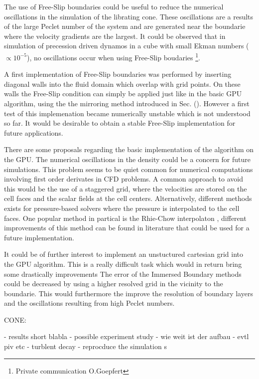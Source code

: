The use of Free-Slip boundaries could be useful to reduce the numerical oscillations in the simulation of the librating cone.
These oscillations are a results of the large Peclet number of the system and are generated
near the boundarie where the velocity gradients are the largest.
It could be observed that in simulation of precession driven dynamos in a cube with small Ekman numbers ($\propto 10^{-5}$),
no oscillations occur when using Free-Slip boudaries \footnote{Private communication O.Goepfert}.

A first implementation of Free-Slip boundaries was performed
by inserting diagonal walls into the fluid domain which overlap with grid points.
On these walls the Free-Slip condition can simply be applied just like in the basic GPU algorithm,
using the the mirroring method introduced in Sec. ().
However a first test of this implemenation became numerically unstable which is not understood so far.
It would be desirable to obtain a stable  Free-Slip implementation for future applications.

There are some proposals regarding the basic implementation of the algorithm on the GPU.
The numerical oscillations in the density could be a concern for future simulations.
This problem seems to be quiet common for numerical computations involving first order derivates in CFD problems.
A common approach to avoid this would be the use of a staggered grid, where the velocities
are stored on the cell faces and the scalar fields at the cell centers.
Alternatively, different methods exists for pressure-based solvers where the pressure is interpolated to the cell faces.
One popular method in partical is the Rhie-Chow interpolaton \citep{uiae},
different improvements of this method can be found in literature \citep{uiae} that could be used for a future implementation.

It could be of further interest to implement an unstuctured cartesian grid into the GPU algorithm.
This is a really difficult task which would in return bring some drastically improvements
The error of the Immersed Boundary methods could be decreased by using a higher resolved grid in the vicinity to the boundarie.
This would furthermore the improve the resolution of boundary layers  and the oscillations
resulting from high Peclet numbers.



CONE:

- results short blabla
- possible experiment study
- wie weit ist der aufbau
- evtl piv etc
- turblent decay
- reprocduce the simulation s

